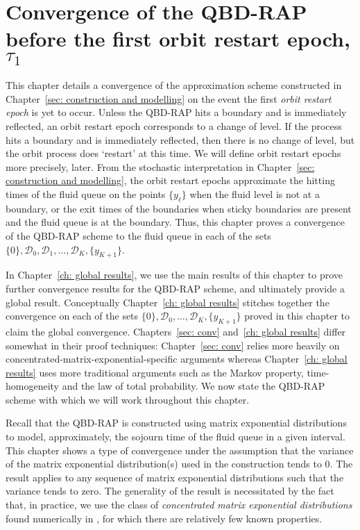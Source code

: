 \chapter{Convergence of the QBD-RAP before the first orbit restart epoch, \(\tau_1\)\label{sec: conv}}
This chapter details a convergence of the approximation scheme constructed in Chapter~\ref{sec: construction and modelling} on the event the first \emph{orbit restart epoch} is yet to occur. Unless the QBD-RAP hits a boundary and is immediately reflected, an orbit restart epoch corresponds to a change of level. If the process hits a boundary and is immediately reflected, then there is no change of level, but the orbit process does `restart' at this time. We will define orbit restart epochs more precisely, later. From the stochastic interpretation in Chapter~\ref{sec: construction and modelling}, the orbit restart epochs approximate the hitting times of the fluid queue on the points \(\{y_\ell\}\) when the fluid level is not at a boundary, or the exit times of the boundaries when sticky boundaries are present and the fluid queue is at the boundary. Thus, this chapter proves a convergence of the QBD-RAP scheme to the fluid queue in each of the sets \(\{0\}, \mathcal D_{0}, \mathcal D_1, \dots, \mathcal D_{K}, \{y_{K+1}\}\).

In Chapter~\ref{ch: global results}, we use the main results of this chapter to prove further convergence results for the QBD-RAP scheme, and ultimately provide a global result. Conceptually Chapter~\ref{ch: global results} stitches together the convergence on each of the sets \(\{0\}, \mathcal D_{0}, \dots, \mathcal D_{K}, \{y_{K+1}\}\) proved in this chapter to claim the global convergence. Chapters~\ref{sec: conv} and~\ref{ch: global results} differ somewhat in their proof techniques: Chapter~\ref{sec: conv} relies more heavily on concentrated-matrix-exponential-specific arguments whereas Chapter~\ref{ch: global results} uses more traditional arguments such as the Markov property, time-homogeneity and the law of total probability. We now state the QBD-RAP scheme with which we will work throughout this chapter.

Recall that the QBD-RAP is constructed using {matrix exponential distributions} to model, approximately, the sojourn time of the fluid queue in a given interval. This chapter shows a type of convergence under the assumption that the variance of the matrix exponential distribution(s) used in the construction tends to 0. The result applies to any sequence of matrix exponential distributions such that the variance tends to zero. The generality of the result is necessitated by the fact that, in practice, we use the class of \emph{concentrated matrix exponential distributions} found numerically in \citep{hht2020}, for which there are relatively few known properties.

